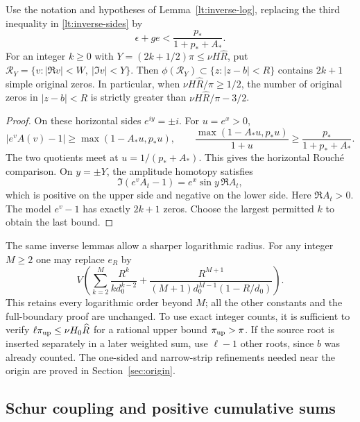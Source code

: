 \begin{lemma}\label{lt:quarter-pi}
Use the notation and hypotheses of Lemma~\ref{lt:inverse-log},
replacing the third inequality in \eqref{lt:inverse-sides} by
\[
 \epsilon+ge<\frac{p_*}{1+p_*+A_*}.
\]
For an integer $k\ge0$ with $Y=(2k+1/2)\pi\le\nu H\widehat R$,
put $\mathcal R_Y=\{v:|\Re v|<W,\ |\Im v|<Y\}$.
Then $\phi(\mathcal R_Y)\subset\{z:|z-b|<R\}$ contains $2k+1$
simple original zeros. In particular, when
$\nu H\widehat R/\pi\ge1/2$, the number of original zeros in
$|z-b|<R$ is strictly greater than
$\nu H\widehat R/\pi-3/2$.
\end{lemma}
\begin{proof}
On these horizontal sides $e^{iy}=\pm i$. For $u=e^x>0$,
\[
 |e^vA(v)-1|\ge\max(1-A_*u,p_*u),\qquad
 \frac{\max(1-A_*u,p_*u)}{1+u}\ge\frac{p_*}{1+p_*+A_*}.
\]
The two quotients meet at $u=1/(p_*+A_*)$. This gives the
horizontal Rouch\'e comparison. On $y=\pm Y$, the amplitude homotopy
satisfies
\[
 \Im(e^vA_t-1)=e^x\sin y\,\Re A_t,
\]
which is positive on the upper side and negative on the lower side.
Here $\Re A_t>0$.
The model $e^v-1$ has exactly
$2k+1$ zeros. Choose the largest permitted $k$ to obtain the
last bound.
\end{proof}

The same inverse lemmas allow a sharper logarithmic radius. For any
integer $M\ge2$ one may replace $e_R$ by
\begin{equation}\label{lt:higher-log-loss}
 V\left(\sum_{k=2}^M\frac{R^k}{k d_0^{k-2}}
       +\frac{R^{M+1}}{(M+1)d_0^{M-1}(1-R/d_0)}\right).
\end{equation}
This retains every logarithmic order beyond $M$; all the other
constants and the full-boundary proof are unchanged. To use exact
integer counts, it is sufficient to verify
$\ell\pi_{\rm up}\le\nu H_0\widehat R$ for a rational upper
bound $\pi_{\rm up}>\pi$. If the source root is inserted separately
in a later weighted sum, use $\ell-1$ other roots, since $b$ was
already counted. The one-sided and narrow-strip refinements needed
near the origin are proved in Section~\ref{sec:origin}.

\subsection{Schur coupling and positive cumulative sums}

